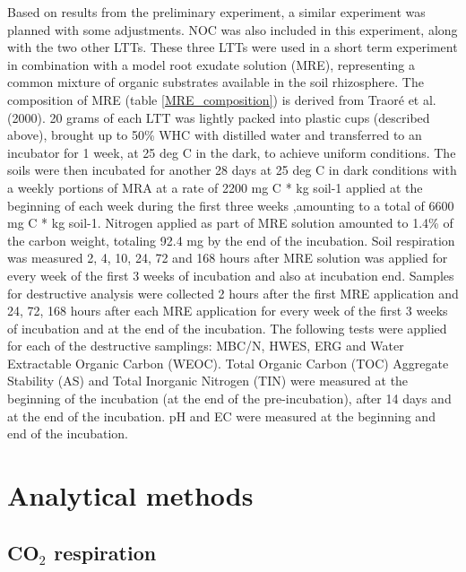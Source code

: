 \documentclass[12pt]{report}
\begin{document}
Based on results from the preliminary experiment, a similar experiment was planned with some adjustments. NOC was also included in this experiment, along with the two other LTTs.
These three LTTs were used in a short term experiment in combination with a model root exudate solution (MRE), representing a common mixture of organic substrates available in the soil rhizosphere. The composition of MRE (table \ref{MRE_composition}) is derived from Traoré et al. (2000).   
20 grams of each LTT was lightly packed into plastic cups (described above), brought up to 50\% WHC with distilled water and transferred to an incubator for 1 week, at 25 deg C in the dark, to achieve uniform conditions. The soils were then incubated for another 28 days at 25 deg C in dark conditions with a weekly portions of MRA at a rate of 2200 mg C * kg soil-1  applied at the beginning of each week during the first three weeks ,amounting to a total of 6600 mg C * kg soil-1. Nitrogen applied as part of MRE solution amounted to 1.4\% of the carbon weight,  totaling 92.4 mg by the end of the incubation. Soil respiration was measured 2, 4, 10, 24, 72 and 168 hours after MRE solution was applied for every week of the first 3 weeks of incubation and also at incubation end. Samples for destructive analysis were collected 2 hours after the first MRE application and 24, 72, 168 hours after  each MRE application for every week of the first 3 weeks of incubation and at the end of the incubation. The following tests were applied for each of the destructive samplings: MBC/N, HWES, ERG and Water Extractable Organic Carbon (WEOC). Total Organic Carbon (TOC) Aggregate Stability (AS) and Total Inorganic Nitrogen (TIN) were measured at the beginning of the incubation (at the end of the pre-incubation), after 14 days and at the end of the incubation. pH and EC were measured at the beginning and end of the incubation.




\section{Analytical methods}

\subsection{CO$_2$ respiration}
\end{document}
